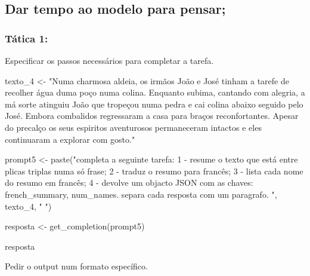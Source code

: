 \documentclass[
  letterpaper,
  paper=6in:9in,
  pagesize=pdftex,
  headinclude=on,
  footinclude=on,
  12pt]{scrbook}
\newenvironment{Shaded}{\begin{snugshade}}{\end{snugshade}}
\newcommand{\FunctionTok}[1]{\textcolor[rgb]{0.28,0.35,0.67}{#1}}
\newcommand{\NormalTok}[1]{\textcolor[rgb]{0.00,0.23,0.31}{#1}}
\newcommand{\OtherTok}[1]{\textcolor[rgb]{0.00,0.23,0.31}{#1}}
\newcommand{\StringTok}[1]{\textcolor[rgb]{0.13,0.47,0.30}{#1}}
\begin{document}
\hypertarget{dar-tempo-ao-modelo-para-pensar}{%
\subsection{Dar tempo ao modelo para
pensar;}\label{dar-tempo-ao-modelo-para-pensar}}

\hypertarget{tuxe1tica-1-1}{%
\subsubsection{Tática 1:}\label{tuxe1tica-1-1}}

Especificar os passos necessários para completar a tarefa.

\begin{Shaded}
\begin{Highlighting}[]
\NormalTok{texto\_4 }\OtherTok{\textless{}{-}} \StringTok{"Numa charmosa aldeia, os irmãos João e José tinham a tarefe de recolher }
\StringTok{água duma poço numa colina. Enquanto subima, cantando com alegria, a má sorte atinguiu João }
\StringTok{que tropeçou numa pedra e cai colina abaixo seguido pelo José. }
\StringTok{Embora combalidos regressaram a casa para braços reconfortantes. }
\StringTok{Apesar do precalço os seus espiritos aventurosos permaneceram intactos e eles continuaram a explorar com gosto."}

\NormalTok{prompt5 }\OtherTok{\textless{}{-}} \FunctionTok{paste}\NormalTok{(}\StringTok{"completa a seguinte tarefa:}
\StringTok{                 1 {-} resume o texto que está entre plicas triplas numa só frase;}
\StringTok{                 2 {-} traduz o resumo para francês;}
\StringTok{                 3 {-} lista cada nome do resumo em francês;}
\StringTok{                 4 {-} devolve um objacto JSON com as chaves: french\_summary, num\_names.}
\StringTok{                 separa cada resposta com um paragrafo. \textquotesingle{}\textquotesingle{}\textquotesingle{} "}\NormalTok{, texto\_4, }\StringTok{"\textquotesingle{}\textquotesingle{}\textquotesingle{} "}\NormalTok{)}

\NormalTok{resposta }\OtherTok{\textless{}{-}} \FunctionTok{get\_completion}\NormalTok{(prompt5)}

\NormalTok{resposta}
\end{Highlighting}
\end{Shaded}

Pedir o output num formato específico.
\end{document}
